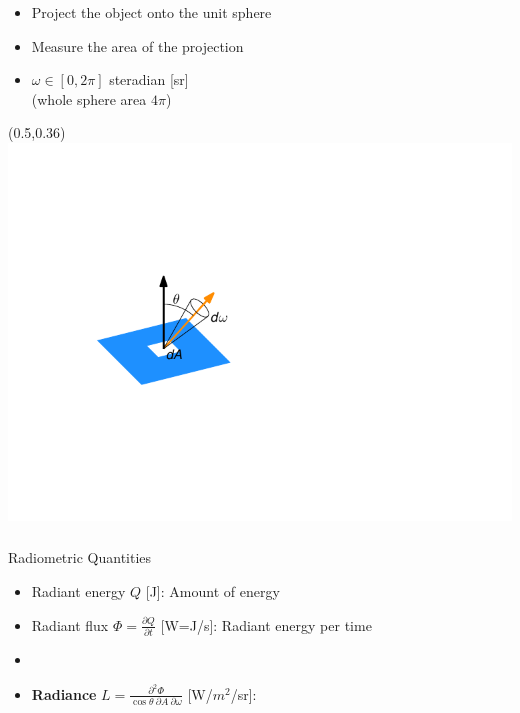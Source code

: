 \documentclass[utf8,stillsansserifmath,fleqn,t]{beamer}
\begin{document}
\begin{frame}
\begin{minipage}{.48\textwidth}
\vspace{-\baselineskip}
\begin{itemize}
\item Project the object onto the unit sphere
\item Measure the area of the projection
\item $\omega \in [0,2\pi]$ steradian [sr]\\
(whole sphere area $4\pi$)
\end{itemize}
\end{minipage}
\end{frame}

\begin{frame}
\begin{textblock}{0.45}(0.5,0.36)\includegraphics[width=\textwidth]{./fig/radiance.pdf}\end{textblock}
\frametitle{\insertsection}
Radiometric Quantities
\begin{itemize}
\item Radiant energy $Q$ [J]:
Amount of energy
\item Radiant flux $\Phi =\frac{\partial Q}{\partial t}$ [W=J/s]:
Radiant energy per time
\item[~] ~
\item \textbf{Radiance} $L = \frac{\partial^2\Phi}{\cos\theta~\partial A~\partial \omega}$ [W/$m^2$/sr]:\\

\end{itemize}
\end{frame}
\end{document}
